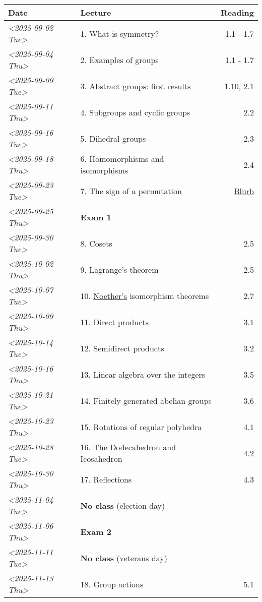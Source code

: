 \documentclass[11pt]{article}
\begin{document}
\begin{center}
\begin{tabular}{llr}
\hline
Date & Lecture & Reading\\[0pt]
\hline
\textit{<2025-09-02 Tue>} & 1. What is symmetry? & 1.1 - 1.7\\[0pt]
\textit{<2025-09-04 Thu>} & 2. Examples of groups & 1.1 - 1.7\\[0pt]
\textit{<2025-09-09 Tue>} & 3. Abstract groups: first results & 1.10, 2.1\\[0pt]
\textit{<2025-09-11 Thu>} & 4. Subgroups and cyclic groups & 2.2\\[0pt]
\textit{<2025-09-16 Tue>} & 5. Dihedral groups & 2.3\\[0pt]
\textit{<2025-09-18 Thu>} & 6. Homomorphisms and isomorphisms & 2.4\\[0pt]
\textit{<2025-09-23 Tue>} & 7. The sign of a permutation & \href{https://kconrad.math.uconn.edu/blurbs/grouptheory/sign.pdf}{Blurb}\\[0pt]
\textit{<2025-09-25 Thu>} & \textbf{Exam 1} & \\[0pt]
\textit{<2025-09-30 Tue>} & 8. Cosets & 2.5\\[0pt]
\textit{<2025-10-02 Thu>} & 9. Lagrange's theorem & 2.5\\[0pt]
\textit{<2025-10-07 Tue>} & 10. \href{https://en.wikipedia.org/wiki/Emmy\_Noether}{Noether's} isomorphism theorems & 2.7\\[0pt]
\textit{<2025-10-09 Thu>} & 11. Direct products & 3.1\\[0pt]
\textit{<2025-10-14 Tue>} & 12. Semidirect products & 3.2\\[0pt]
\textit{<2025-10-16 Thu>} & 13. Linear algebra over the integers & 3.5\\[0pt]
\textit{<2025-10-21 Tue>} & 14. Finitely generated abelian groups & 3.6\\[0pt]
\textit{<2025-10-23 Thu>} & 15. Rotations of regular polyhedra & 4.1\\[0pt]
\textit{<2025-10-28 Tue>} & 16. The Dodecahedron and Icosahedron & 4.2\\[0pt]
\textit{<2025-10-30 Thu>} & 17. Reflections & 4.3\\[0pt]
\textit{<2025-11-04 Tue>} & \textbf{No class} (election day) & \\[0pt]
\textit{<2025-11-06 Thu>} & \textbf{Exam 2} & \\[0pt]
\textit{<2025-11-11 Tue>} & \textbf{No class} (veterans day) & \\[0pt]
\textit{<2025-11-13 Thu>} & 18. Group actions & 5.1\\[0pt]

\end{tabular}
\end{center}
\end{document}
